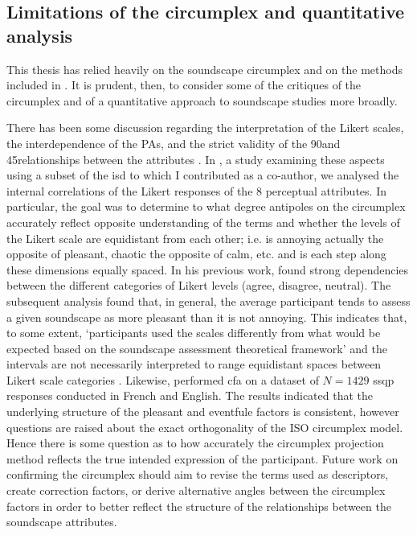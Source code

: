 \subsection{Limitations of the circumplex and quantitative analysis}

This thesis has relied heavily on the soundscape circumplex and on the methods included in \cite{ISO12913Part2}. It is prudent, then, to consider some of the critiques of the circumplex and of a quantitative approach to soundscape studies more broadly.

There has been some discussion regarding the interpretation of the Likert scales, the interdependence of the PAs, and the strict validity of the 90\textdegree and 45\textdegree relationships between the attributes \citep{Lionello2021Thesis, Tarlao2020Investigating}. In \citet{Lionello2021Introducing}, a study examining these aspects using a subset of the \gls{isd} to which I contributed as a co-author, we analysed the internal correlations of the Likert responses of the 8 perceptual attributes. In particular, the goal was to determine to what degree antipoles on the circumplex accurately reflect opposite understanding of the terms and whether the levels of the Likert scale are equidistant from each other; i.e. is annoying actually the opposite of pleasant, chaotic the opposite of calm, etc. and is each step along these dimensions equally spaced. In his previous work, \citet{Lionello2019dimension} found strong dependencies between the different categories of Likert levels (agree, disagree, neutral). The subsequent analysis found that, in general, the average participant tends to assess a given soundscape as more pleasant than it is not annoying. This indicates that, to some extent, `participants used the scales differently from what would be expected based on the soundscape assessment theoretical framework' and the intervals are not necessarily interpreted to range equidistant spaces between Likert scale categories \citep{Lionello2021Introducing}. Likewise, \citet{Tarlao2020Investigating} performed \gls{cfa} on a dataset of $N=1429$ \gls{ssqp} responses conducted in French and English. The results indicated that the underlying structure of the pleasant and eventfule factors is consistent,  however questions are raised about the exact orthogonality of the ISO circumplex model. Hence there is some question as to how accurately the circumplex projection method reflects the true intended expression of the participant. Future work on confirming the circumplex should aim to revise the terms used as descriptors, create correction factors, or derive alternative angles between the circumplex factors in order to better reflect the structure of the relationships between the soundscape attributes.

